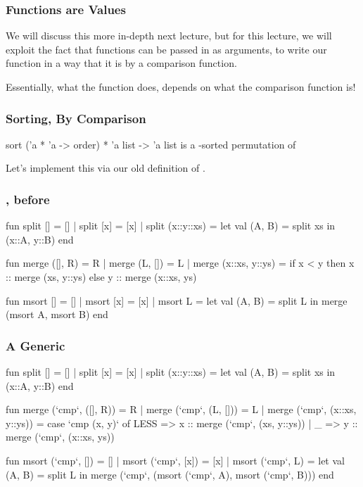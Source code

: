 \documentclass[aspectratio=169, handout]{beamer}
\begin{document}
\begin{frame}[fragile]
  \frametitle{Functions are Values}

  We will discuss this more in-depth next lecture, but for this lecture, we will
  exploit the fact that functions can be passed in as arguments, to write our
   function in a way that it is  by a comparison
  function.

  \pause
  \vspace{\fill}

  Essentially, what the  function does, depends on what the comparison
  function is!
\end{frame}

\begin{frame}[fragile]
  \frametitle{Sorting, By Comparison}

  \spec
    {sort}
    {('a * 'a -> order) * 'a list -> 'a list}
    {}
    { is a -sorted permutation of }

  \pause
  \vspace{\fill}

  Let's implement this via our old definition of .
\end{frame}

\begin{frame}[fragile]
  \frametitle{, before}
  {\tiny
  \begin{codeblock}
    fun split [] = []
      | split [x] = [x]
      | split (x::y::xs) =
          let
            val (A, B) = split xs
          in
            (x::A, y::B)
          end

    fun merge ([], R) = R
      | merge (L, []) = L
      | merge (x::xs, y::ys) =
          if x < y then
            x :: merge (xs, y::ys)
          else
            y :: merge (x::xs, ys)

    fun msort [] = []
      | msort [x] = [x]
      | msort L =
          let
            val (A, B) = split L
          in
            merge (msort A, msort B)
          end
  \end{codeblock}
  }
\end{frame}


\begin{frame}[fragile]
  \frametitle{A Generic }
  {\tiny
  \begin{codeblock}
    fun split [] = []
      | split [x] = [x]
      | split (x::y::xs) =
          let
            val (A, B) = split xs
          in
            (x::A, y::B)
          end

    fun merge (`cmp`, ([], R)) = R
      | merge (`cmp`, (L, [])) = L
      | merge (`cmp`, (x::xs, y::ys)) =
          case `cmp (x, y)` of
            LESS => x :: merge (`cmp`, (xs, y::ys))
          | _ => y :: merge (`cmp`, (x::xs, ys))

    fun msort (`cmp`, []) = []
      | msort (`cmp`, [x]) = [x]
      | msort (`cmp`, L) =
          let
            val (A, B) = split L
          in
            merge (`cmp`, (msort (`cmp`, A), msort (`cmp`, B)))
          end
  \end{codeblock}
  }
\end{frame}
\end{document}
